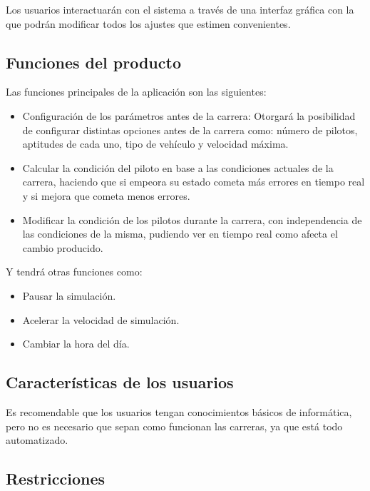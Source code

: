 \bigskip

Los usuarios interactuarán con el sistema a través de una interfaz gráfica con la que podrán modificar todos los ajustes que estimen convenientes.

\subsection{Funciones del producto}

Las funciones principales de la aplicación son las siguientes:

\begin{itemize}
    \item Configuración de los parámetros antes de la carrera: Otorgará la posibilidad de configurar distintas opciones antes de la carrera como: número de pilotos, aptitudes de cada uno, tipo de vehículo y velocidad máxima. 
    
    \item Calcular la condición del piloto en base a las condiciones actuales de la carrera, haciendo que si empeora su estado cometa más errores en tiempo real y si mejora que cometa menos errores.
    
    \item Modificar la condición de los pilotos durante la carrera, con independencia de las condiciones de la misma, pudiendo ver en tiempo real como afecta el cambio producido.
\end{itemize}

Y tendrá otras funciones como:

\begin{itemize}
    \item Pausar la simulación.
    \item Acelerar la velocidad de simulación.
    \item Cambiar la hora del día.
\end{itemize}

\subsection{Características de los usuarios}

Es recomendable que los usuarios tengan conocimientos básicos de informática, pero no es necesario que sepan como funcionan las carreras, ya que está todo automatizado. 

\subsection{Restricciones}

